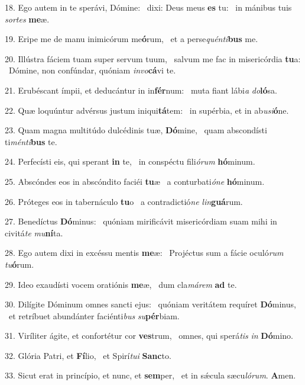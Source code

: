 18. Ego autem in te sperávi, Dómine: \dag\  dixi: Deus meus \textbf{es} tu: \ast\  in mánibus tuis \textit{sor}\textit{tes} \textbf{me}æ.\

19. Eripe me de manu inimicórum me\textbf{ó}rum, \ast\  et a perse\textit{quén}\textit{ti}\textbf{bus} me.\

20. Illústra fáciem tuam super servum tuum, \dag\  salvum me fac in misericórdia \textbf{tu}a: \ast\  Dómine, non confúndar, quóniam \textit{in}\textit{vo}\textbf{cá}vi te.\

21. Erubéscant ímpii, et deducántur in in\textbf{fér}num: \ast\  muta fiant lábi\textit{a} \textit{do}\textbf{ló}sa.\

22. Quæ loquúntur advérsus justum iniqui\textbf{tá}tem: \ast\  in supérbia, et in ab\textit{u}\textit{si}\textbf{ó}ne.\

23. Quam magna multitúdo dulcédinis tuæ, \textbf{Dó}mine, \ast\  quam abscondísti ti\textit{mén}\textit{ti}\textbf{bus} te.\

24. Perfecísti eis, qui sperant \textbf{in} te, \ast\  in conspéctu fili\textit{ó}\textit{rum} \textbf{hó}minum.\

25. Abscóndes eos in abscóndito faciéi \textbf{tu}æ \ast\  a conturbati\textit{ó}\textit{ne} \textbf{hó}minum.\

26. Próteges eos in tabernáculo \textbf{tu}o \ast\  a contradictió\textit{ne} \textit{lin}\textbf{guá}rum.\

27. Benedíctus \textbf{Dó}minus: \ast\  quóniam mirificávit misericórdiam suam mihi in civitá\textit{te} \textit{mu}\textbf{ní}ta.\

28. Ego autem dixi in excéssu mentis \textbf{me}æ: \ast\  Projéctus sum a fácie oculó\textit{rum} \textit{tu}\textbf{ó}rum.\

29. Ideo exaudísti vocem oratiónis \textbf{me}æ, \ast\  dum cla\textit{má}\textit{rem} \textbf{ad} te.\

30. Dilígite Dóminum omnes sancti ejus: \dag\  quóniam veritátem requíret \textbf{Dó}minus, \ast\  et retríbuet abundánter faciénti\textit{bus} \textit{su}\textbf{pér}biam.\

31. Viríliter ágite, et confortétur cor \textbf{ves}trum, \ast\  omnes, qui sperá\textit{tis} \textit{in} \textbf{Dó}mino.\

32. Glória Patri, et \textbf{Fí}lio, \ast\  et Spirí\textit{tu}\textit{i} \textbf{Sanc}to.\

33. Sicut erat in princípio, et nunc, et \textbf{sem}per, \ast\  et in sǽcula sæcu\textit{ló}\textit{rum}. \textbf{A}men.\

